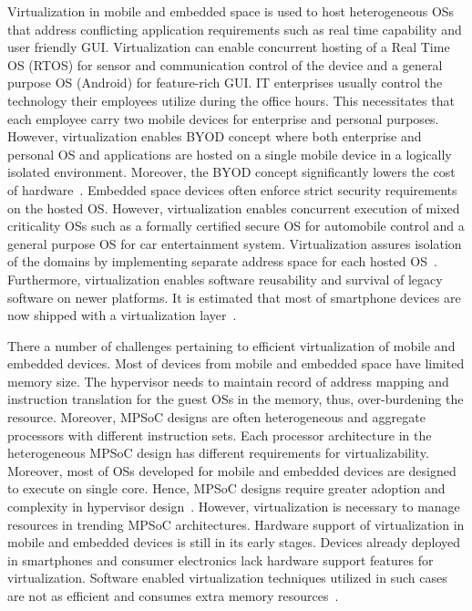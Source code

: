 \documentclass[journal, 10pt]{IEEEtran}
\begin{document}
Virtualization in mobile and embedded space is used to host heterogeneous OSs that address conflicting application requirements such as real time capability and user friendly GUI. Virtualization can enable concurrent hosting of a Real Time OS (RTOS) for sensor and communication control of the device and a general purpose OS (Android) for feature-rich GUI. IT enterprises usually control the technology their employees utilize during the office hours. This necessitates that each employee carry two mobile devices for enterprise and personal purposes. However, virtualization enables BYOD concept where both enterprise and personal OS and applications are hosted on a single mobile device in a logically isolated environment. Moreover, the BYOD concept significantly lowers the cost of hardware~\cite{Earley2014}. Embedded space devices often enforce strict security requirements on the hosted OS. However, virtualization enables concurrent execution of mixed criticality OSs such as a formally certified secure OS for automobile control and a general purpose OS for car entertainment system. Virtualization assures isolation of the domains by implementing separate address space for each hosted OS~\cite{Varanasi2011}. Furthermore, virtualization enables software reusability and survival of legacy software on newer platforms. It is estimated that most of smartphone devices are now shipped with a virtualization layer~\cite{GartnerGroup2008}. 

There a number of challenges pertaining to efficient virtualization of mobile and embedded devices. Most of devices from mobile and embedded space have limited memory size. The hypervisor needs to maintain record of address mapping and instruction translation for the guest OSs in the memory, thus, over-burdening the resource. Moreover, MPSoC designs are often heterogeneous and aggregate processors with different instruction sets. Each processor architecture in the heterogeneous MPSoC design has different requirements for virtualizability. Moreover, most of OSs developed for mobile and embedded devices are designed to execute on single core. Hence, MPSoC designs require greater adoption and complexity in hypervisor design~\cite{Aguiar2011a}. However, virtualization is necessary to manage resources in trending MPSoC architectures. Hardware support of virtualization in mobile and embedded devices is still in its early stages. Devices already deployed in smartphones and consumer electronics lack hardware support features for virtualization. Software enabled virtualization techniques utilized in such cases are not as efficient and consumes extra memory resources~\cite{Brash2010}.
\end{document}
